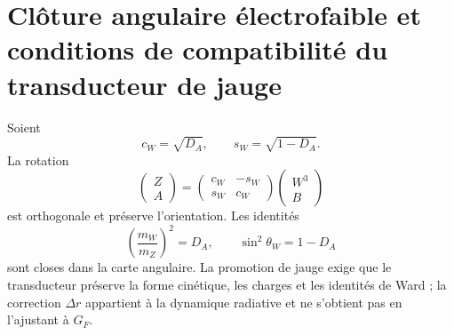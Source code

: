 \section{Clôture angulaire électrofaible et conditions de compatibilité du transducteur de jauge}
\label{sec:p3-final:cierre-electrodebil}

Soient
\[
 c_W=\sqrt{D_A},
 \qquad
 s_W=\sqrt{1-D_A}.
\]
La rotation
\[
 \begin{pmatrix}Z\\A\end{pmatrix}
 =
 \begin{pmatrix}c_W&-s_W\\s_W&c_W\end{pmatrix}
 \begin{pmatrix}W^3\\B\end{pmatrix}
\]
est orthogonale et préserve l’orientation. Les identités
\[
 \left(\frac{m_W}{m_Z}\right)^2=D_A,
 \qquad
 \sin^2\theta_W=1-D_A
\]
sont closes dans la carte angulaire. La promotion de jauge exige que le
transducteur préserve la forme cinétique, les charges et les identités de Ward ;
la correction \(\Delta r\) appartient à la dynamique radiative et ne s’obtient pas
en l’ajustant à \(G_F\).

